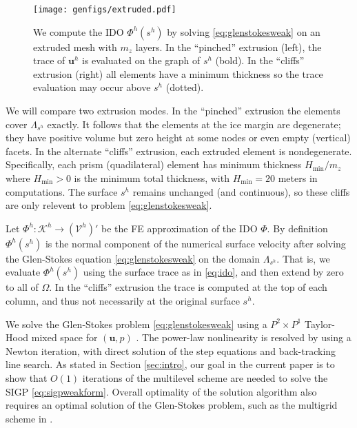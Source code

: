 \documentclass[letterpaper,final,12pt,reqno]{amsart}
\theoremstyle{claim}
\newcommand{\bu}{\mathbf{u}}
\numberwithin{equation}{section}
\numberwithin{figure}{section}
\numberwithin{table}{section}
\numberwithin{theorem}{section}
\begin{document}
\begin{figure}[t]
\begin{center}
\texttt{[image: genfigs/extruded.pdf]}
\end{center}
\caption{We compute the IDO $\Phi^h(s^h)$ by solving \eqref{eq:glenstokesweak} on an extruded mesh with $m_z$ layers.  In the ``pinched'' extrusion (left), the trace of $\bu^h$ is evaluated on the graph of $s^h$ (bold).  In the ``cliffs'' extrusion (right) all elements have a minimum thickness so the trace evaluation may occur above $s^h$ (dotted).}
\label{fig:extruded}
\end{figure}

We will compare two extrusion modes.  In the ``pinched'' extrusion the elements cover $\Lambda_{s^h}$ exactly.  It follows that the elements at the ice margin are degenerate; they have positive volume but zero height at some nodes or even empty (vertical) facets.  In the alternate ``cliffs'' extrusion, each extruded element is nondegenerate.  Specifically, each prism (quadilateral) element has minimum thickness $H_{\text{min}}/m_z$ where $H_{\text{min}} > 0$ is the minimum total thickness, with $H_{\text{min}} = 20$ meters in computations.  The surface $s^h$ remains unchanged (and continuous), so these cliffs are only relevent to problem \eqref{eq:glenstokesweak}.

Let $\Phi^h:\mathcal{K}^h \to (\mathcal{V}^h)'$ be the FE approximation of the IDO $\Phi$.  By definition $\Phi^h(s^h)$ is the normal component of the numerical surface velocity after solving the Glen-Stokes equation \eqref{eq:glenstokesweak} on the domain $\Lambda_{s^h}$.  That is, we evaluate $\Phi^h(s^h)$ using the surface trace as in \eqref{eq:ido}, and then extend by zero to all of $\Omega$.  In the ``cliffs'' extrusion the trace is computed at the top of each column, and thus not necessarily at the original surface $s^h$.

We solve the Glen-Stokes problem \eqref{eq:glenstokesweak} using a $P^2 \times P^1$ Taylor-Hood mixed space for $(\bu,p)$ \cite{Elmanetal2014}.  The power-law nonlinearity is resolved by using a Newton iteration, with direct solution of the step equations and back-tracking line search.  As stated in Section \ref{sec:intro}, our goal in the current paper is to show that $O(1)$ iterations of the multilevel scheme are needed to solve the SIGP \eqref{eq:sigpweakform}.  Overall optimality of the solution algorithm also requires an optimal solution of the Glen-Stokes problem, such as the multigrid scheme in \cite{IsaacStadlerGhattas2015}.
\end{document}
